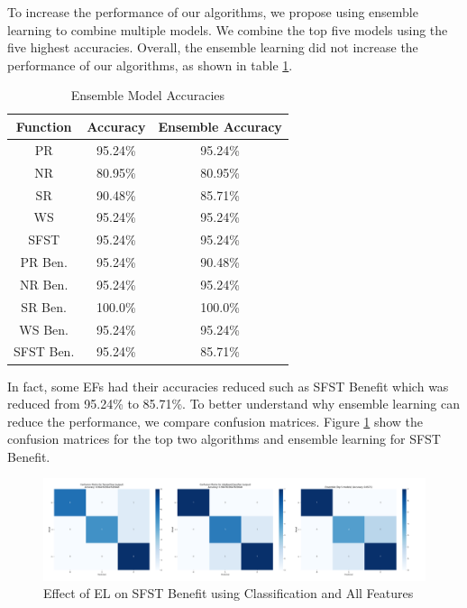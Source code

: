 \documentclass[12pt,letterpaper]{article}
\begin{document}
To increase the performance of our algorithms, we propose using ensemble learning to combine multiple models.
We combine the top five models using the five highest accuracies.
Overall, the ensemble learning did not increase the performance of our algorithms, as shown in table \ref{tab_class_all:class_ensemble}.
\begin{table}[H]
\centering
\begin{tabular}{|c|c|c|}
\hline
\textbf{Function} & \textbf{Accuracy} & \textbf{Ensemble Accuracy} \\
\hline
PR      & 95.24\% & 95.24\% \\
\hline
NR      & 80.95\% & 80.95\%\\
\hline
SR      & 90.48\% & 85.71\%\\
\hline
WS      & 95.24\% & 95.24\%\\
\hline
SFST    & 95.24\% & 95.24\%\\
\hline
PR Ben. & 95.24\% & 90.48\%\\
\hline
NR Ben. & 95.24\% & 95.24\%\\
\hline
SR Ben. & 100.0\% & 100.0\%\\
\hline
WS Ben. & 95.24\% & 95.24\%\\
\hline
SFST Ben. & 95.24\% & 85.71\%\\
\hline
\end{tabular}
\caption{Ensemble Model Accuracies}
\label{tab_class_all:class_ensemble}
\end{table}

In fact, some \ac{EF}s had their accuracies reduced such as \ac{SFST} Benefit which was reduced from 95.24\% to 85.71\%.
To better understand why ensemble learning can reduce the performance, we compare confusion matrices.
Figure \ref{fig_class_all:EL_SFST} show the confusion matrices for the top two algorithms and ensemble learning for SFST Benefit. 

\begin{figure}
    \centering
    \includegraphics[width=0.95\linewidth]{class_all_section/top_2_and_ensemble_confusion_matrices_SFST_Benefit.png}
    \caption{Effect of EL on SFST Benefit using Classification and All Features}
    \label{fig_class_all:EL_SFST}
\end{figure}
\end{document}
